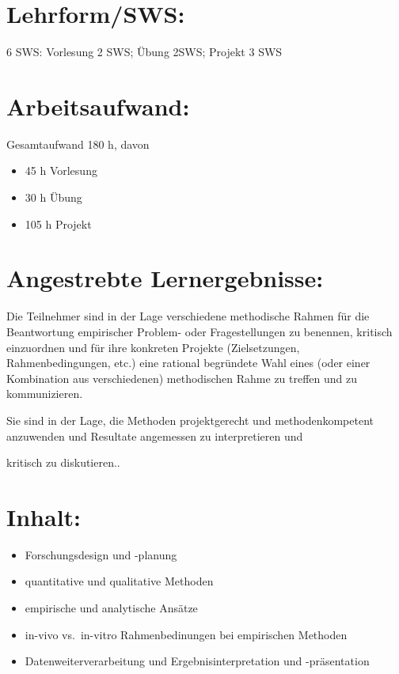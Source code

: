 \section*{Lehrform/SWS:}\label{lehrformsws-3}

6 SWS: Vorlesung 2 SWS; Übung 2SWS; Projekt 3 SWS

\section*{Arbeitsaufwand:}\label{arbeitsaufwand-9}

Gesamtaufwand 180 h, davon

\begin{itemize}
\item
  45 h Vorlesung
\item
  30 h Übung
\item
  105 h Projekt
\end{itemize}

\section*{Angestrebte
Lernergebnisse:}\label{angestrebte-lernergebnisse-3}

Die Teilnehmer sind in der Lage verschiedene methodische Rahmen für die
Beantwortung empirischer Problem- oder Fragestellungen zu benennen,
kritisch einzuordnen und für ihre konkreten Projekte (Zielsetzungen,
Rahmenbedingungen, etc.) eine rational begründete Wahl eines (oder einer
Kombination aus verschiedenen) methodischen Rahme zu treffen und zu
kommunizieren.

Sie sind in der Lage, die Methoden projektgerecht und methodenkompetent
anzuwenden und Resultate angemessen zu interpretieren und

kritisch zu diskutieren..

\section*{Inhalt:}\label{inhalt-3}

\begin{itemize}
\item
  Forschungsdesign und -planung
\item
  quantitative und qualitative Methoden
\item
  empirische und analytische Ansätze
\item
  in-vivo vs.~in-vitro Rahmenbedinungen bei empirischen Methoden
\item
  Datenweiterverarbeitung und Ergebnisinterpretation und -präsentation
\end{itemize}

